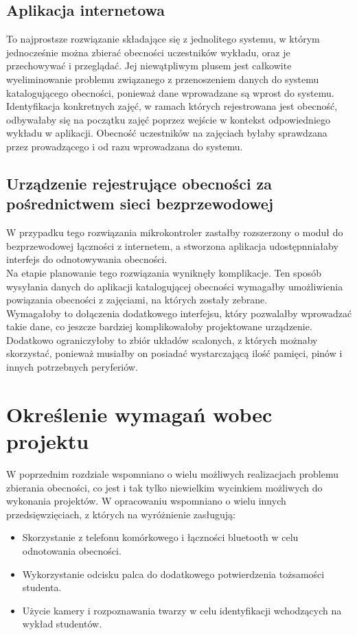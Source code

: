\documentclass[declaration,shortabstract, mgr]{iithesis}
\begin{document}
\subsection{Aplikacja internetowa}
\indent To najprostsze rozwiązanie składające się z jednolitego systemu, w którym jednocześnie można zbierać obecności uczestników wykładu, oraz je przechowywać i przeglądać. Jej niewątpliwym plusem jest całkowite wyeliminowanie problemu związanego z przenoszeniem danych do systemu katalogującego obecności, ponieważ dane wprowadzane są wprost do systemu. Identyfikacja konkretnych zajęć, w ramach których rejestrowana jest obecność, odbywałaby się na początku zajęć poprzez wejście w kontekst odpowiedniego wykładu w aplikacji. Obecność uczestników na zajęciach byłaby sprawdzana przez prowadzącego i od razu wprowadzana do systemu. \\

\subsection{Urządzenie rejestrujące obecności za pośrednictwem sieci bezprzewodowej}
\indent W przypadku tego rozwiązania mikrokontroler zastałby rozszerzony o moduł do bezprzewodowej łączności z internetem, a stworzona aplikacja udostępnniałaby interfejs do odnotowywania obecności. \\
\indent Na etapie planowanie tego rozwiązania wyniknęły komplikacje. Ten sposób wysyłania danych do aplikacji katalogującej obecności wymagałby umożliwienia powiązania obecności z zajęciami, na których zostały zebrane. \\
\indent Wymagałoby to dołączenia dodatkowego interfejsu, który pozwalałby wprowadzać takie dane, co jeszcze bardziej komplikowałoby projektowane urządzenie. Dodatkowo ograniczyłoby to zbiór układów scalonych, z których możnaby skorzystać, ponieważ musiałby on posiadać wystarczającą ilość pamięci, pinów i innych potrzebnych peryferiów.

\section{Określenie wymagań wobec projektu}
\indent W poprzednim rozdziale wspomniano o wielu możliwych realizacjach problemu zbierania obecności, co jest i tak tylko niewielkim wycinkiem możliwych do wykonania projektów. W opracowaniu \cite{review} wspomniano o wielu innych przedsięwzięciach, z których na wyróżnienie zasługują:

\begin{itemize}
\item Skorzystanie z telefonu komórkowego i łączności bluetooth w celu odnotowania obecności.
\item Wykorzystanie odcisku palca do dodatkowego potwierdzenia tożsamości studenta.
\item Użycie kamery i rozpoznawania twarzy w celu identyfikacji wchodzących na wykład studentów.
\end{itemize}
\end{document}
